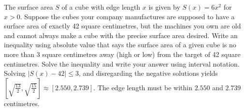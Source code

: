 {The surface area $S$ of a cube with edge length $x$ is given by $S(x) = 6x^{2}$ for $x > 0$.  Suppose the cubes your company manufactures are supposed to have a surface area of exactly 42 square centimetres, but the machines you own are old and cannot always make a cube with the precise surface area desired.  Write an inequality using absolute value that says the surface area of a given cube is no more than 3 square centimetres away (high or low) from the target of 42 square centimetres.  Solve the inequality and write your answer using interval notation.}
{Solving $|S(x) - 42| \leq 3$, and disregarding the negative solutions yields $\left[\sqrt{\frac{13}{2}}, \sqrt{\frac{15}{2}}\right] \approx [2.550, 2.739]$.  The edge length must be within $2.550$ and $2.739$ centimetres.}